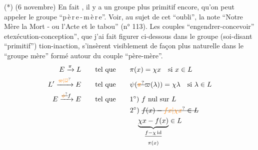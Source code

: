 {\small (*) (6 novembre) En fait , il y a un groupe plus primitif encore, qu'on peut appeler le groupe ``p\,è\,r\,e\,-\,m\,è\,r\,e''. Voir, au sujet de cet ``oubli'', la note ``Notre Mère la Mort - ou l'Acte et le tabou'' (n° 113). Les couples ``engendrer-concevoir'' etexécution-conception'', que j'ai fait figurer ci-dessous dans le groupe (soi-disant ``primitif'') tion-inaction, s'insèrent visiblement de façon plus naturelle dans le ``groupe mère'' formé autour du couple ``père-mère''.}
\[
\begin{aligned}
E\xrightarrow{\pi}L&\qquad\text{tel que}\qquad \pi(x)=\chi x\quad\text{si }x\in L\\
L'\xrightarrow{\unsure{\varpi|\overline{\omega}}}E&\qquad\text{tel que}\qquad
\psi(\deleted{\unsure{\pi}}\varpi(\lambda))=\chi\lambda\quad\text{si }\lambda\in L\\
E\xrightarrow{\deleted{\unsure{\phi}}f}E&\qquad\text{tel que}\qquad
1^\circ)\ f\ \text{nul sur } L\\
&\hspace{7em}2^\circ)\ \deleted{f(x)-\unsure{fx|\chi x}\in L}\\
&\hspace{8em}\underbrace{\chi x-f(x)}_{\substack{\deleted{f-\chi\,\mathrm{id}}\\\pi(x)}}\in L
\end{aligned}
\]

